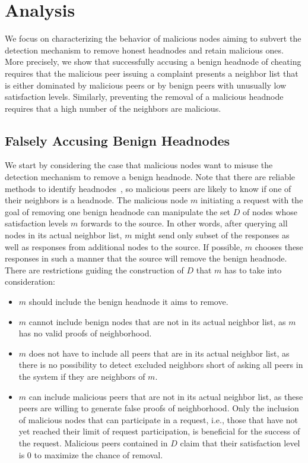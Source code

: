 \section{Analysis}
\label{sec:analysis}


We focus on characterizing the behavior of malicious nodes aiming to subvert the detection mechanism to remove honest headnodes and retain malicious ones. 
More precisely, we show that successfully accusing a benign headnode of cheating requires that the malicious peer issuing a complaint presents a neighbor list that is either dominated by malicious peers or by benign peers with unusually low satisfaction levels.
Similarly, preventing the removal of a malicious headnode requires that a high number of the  neighbors are malicious.



\subsection{Falsely Accusing Benign Headnodes}

We start by considering the case that malicious nodes want to misuse the detection mechanism to remove a benign headnode. 
Note that there are reliable methods to identify headnodes~\cite{nguyen2016swap}, so malicious peers are likely to know if one of their neighbors is a headnode.  
The malicious node $m$ initiating a request with the goal of removing one benign headnode can manipulate the set $D$ of nodes whose satisfaction levels $m$ forwards to the source. 
In other words, after querying all nodes in its actual neighbor list, $m$ might send only  subset of the responses as well as responses from additional nodes to the source. If possible, $m$ chooses these responses in such a manner that the source will remove the benign headnode. 
There are restrictions guiding the construction of $D$ that $m$ has to take into consideration:
\begin{itemize}
\item $m$ should include the benign headnode it aims to remove. 
\item $m$ cannot include benign nodes that are not in its actual neighbor list, as $m$ has no valid proofs of neighborhood. 
\item $m$ does not have to include all peers that are in its actual neighbor list, as there is no possibility to detect excluded neighbors short of asking all peers in the system if they are neighbors of $m$. 
\item $m$ can include malicious peers that are not in its actual neighbor list, as these peers are willing to generate false proofs of neighborhood. Only the inclusion of malicious nodes that can participate in a \drop request, i.e., those that have not yet reached their limit of \drop request participation, is beneficial for the success of the request. Malicious peers contained in $D$ claim that their satisfaction level is 0 to maximize the chance of removal. 
\end{itemize}

